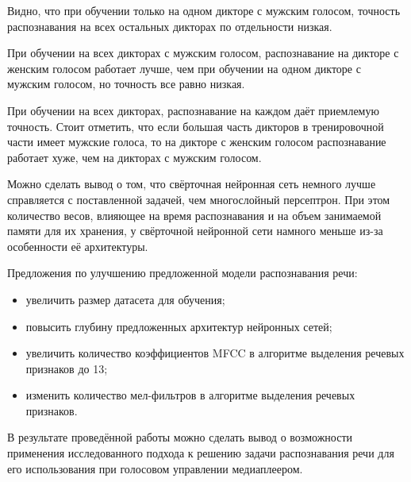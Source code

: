 Видно, что при обучении только на одном дикторе с мужским голосом, точность распознавания на всех остальных дикторах по отдельности низкая. 

При обучении на всех дикторах с мужским голосом, распознавание на дикторе с женским голосом работает лучше, чем при обучении на одном дикторе с мужским голосом, но точность все равно низкая.

При обучении на всех дикторах, распознавание на каждом даёт приемлемую точность. Стоит отметить, что если большая часть дикторов в тренировочной части имеет мужские голоса, то на дикторе с женским голосом распознавание работает хуже, чем на дикторах с мужским голосом.

Можно сделать вывод о том, что свёрточная нейронная сеть немного лучше справляется с поставленной задачей, чем многослойный персептрон. При этом количество весов, влияющее на время распознавания и на объем занимаемой памяти для их хранения, у свёрточной нейронной сети намного меньше из-за особенности её архитектуры.

Предложения по улучшению предложенной модели распознавания речи:
\begin{itemize}[leftmargin=2cm]
	\item увеличить размер датасета для обучения;
	\item повысить глубину предложенных архитектур нейронных сетей;
	\item увеличить количество коэффициентов MFCC в алгоритме выделения речевых признаков до 13;
	\item изменить количество мел-фильтров в алгоритме выделения речевых признаков.
\end{itemize}

В результате проведённой работы можно сделать вывод о возможности применения исследованного подхода к решению задачи распознавания речи для его использования при голосовом управлении медиаплеером.